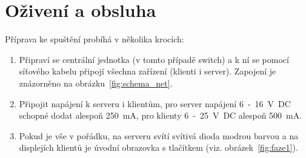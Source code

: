 \section{Oživení a obsluha}
\label{sec:ovladani}
Příprava ke spuštění probíhá v několika krocích:
\begin{enumerate}
  \item Připraví se centrální jednotka (v tomto případě switch) a k ní se pomocí síťového kabelu připojí všechna zařízení (klienti i server). Zapojení je znázorněno na obrázku~\ref{fig:schema_net}.

  \item Připojit napájení k serveru i klientům, pro server napájení 6~-~16~V~DC schopné dodat alespoň 250~mA, pro klienty 6~-~25~V~DC alespoň 500~mA.

  \item Pokud je vše v pořádku, na serveru svítí svítivá dioda modrou barvou a na displejích klientů je úvodní obrazovka s tlačítkem  (viz. obrázek~\ref{fig:faze1}).
\end{enumerate}

